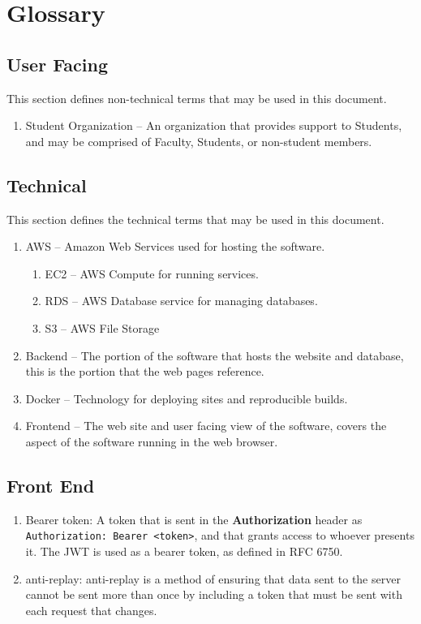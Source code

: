 \section{Glossary}
    \subsection{User Facing}
    This section defines non-technical terms that may be used in this document.
    \begin{enumerate}[leftmargin=3\parindent]
        \item Student Organization -- An organization that provides support to Students, and may be comprised of Faculty, Students, or non-student members.
    \end{enumerate}

    \subsection{Technical}
    This section defines the technical terms that may be used in this document.
    \begin{enumerate}[leftmargin=3\parindent]
        \item AWS -- Amazon Web Services used for hosting the software.
        \begin{enumerate}[leftmargin=3\parindent]
            \item EC2 -- AWS Compute for running services.
            \item RDS -- AWS Database service for managing databases.
            \item S3 -- AWS File Storage
        \end{enumerate}
        \item Backend -- The portion of the software that hosts the website and database, this is the portion that the web pages reference.
        \item Docker -- Technology for deploying sites and reproducible builds.
        \item Frontend -- The web site and user facing view of the software, covers the aspect of the software running in the web browser.
    \end{enumerate}

    \subsection{Front End}
    \begin{enumerate}[leftmargin=3\parindent]
        \item Bearer token: A token that is sent in the \textbf{Authorization} header as \texttt{Authorization: Bearer <token>}, and that grants access to whoever presents it. The JWT is used as a bearer token, as defined in RFC 6750.
        \item anti-replay: anti-replay is a method of ensuring that data sent to the server cannot be sent more than once by including a token that must be sent with each request that changes.
    \end{enumerate}
